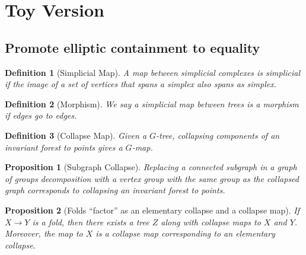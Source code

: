\documentclass{article}
\theoremstyle{mystyle}
\newtheorem{pro}{Proposition}[section]
\newtheorem{defn}{Definition}[section]
\theoremstyle{remark}
\begin{document}
\section{Toy Version}
\subsection{Promote elliptic containment to equality}



\begin{defn}
    [Simplicial Map]
    A map between simplicial complexes is simplicial if the image of a set of vertices that spans a simplex also spans as simplex.
\end{defn}

\begin{defn}
    [Morphism]
    We say a simplicial map between trees is a morphism if edges go to edges.
\end{defn}

\begin{defn}
    [Collapse Map]
    Given a \(G\)-tree, collapsing components of an invariant forest to points gives a \(G\)-map.
\end{defn}
\begin{pro}
    [Subgraph Collapse]
    Replacing a connected subgraph in a graph of groups decomposition with a vertex group with the same group as the collapsed graph corresponds to collapsing an invariant forest to points.
\end{pro}

\begin{pro}
    [Folds ``factor'' as an elementary collapse and a collapse map]
    \label{pro:foldfactor} 
    If \(X \to Y\) is a fold, then there exists a tree \(Z\) along with collapse maps to \(X\) and
\(Y\). Moreover, the map to \(X\) is a collapse map corresponding to an elementary collapse.
\end{pro}
\end{document}
